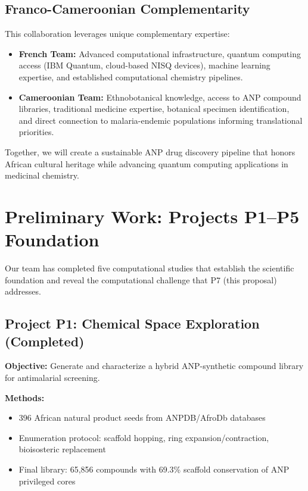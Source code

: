 \documentclass[11pt,a4paper]{article}
\begin{document}
\subsection{Franco-Cameroonian Complementarity}

This collaboration leverages unique complementary expertise:

\begin{itemize}[leftmargin=1.5em]
    \item \textbf{French Team:} Advanced computational infrastructure, quantum computing access (IBM Quantum, cloud-based NISQ devices), machine learning expertise, and established computational chemistry pipelines.
    
    \item \textbf{Cameroonian Team:} Ethnobotanical knowledge, access to ANP compound libraries, traditional medicine expertise, botanical specimen identification, and direct connection to malaria-endemic populations informing translational priorities.
\end{itemize}

Together, we will create a sustainable ANP drug discovery pipeline that honors African cultural heritage while advancing quantum computing applications in medicinal chemistry.

\section{Preliminary Work: Projects P1--P5 Foundation}

Our team has completed five computational studies that establish the scientific foundation and reveal the computational challenge that P7 (this proposal) addresses.

\subsection{Project P1: Chemical Space Exploration (Completed)}

\textbf{Objective:} Generate and characterize a hybrid ANP-synthetic compound library for antimalarial screening.

\textbf{Methods:}
\begin{itemize}
    \item 396 African natural product seeds from ANPDB/AfroDb databases
    \item Enumeration protocol: scaffold hopping, ring expansion/contraction, bioisosteric replacement
    \item Final library: 65,856 compounds with 69.3\% scaffold conservation of ANP privileged cores
\end{itemize}
\end{document}
